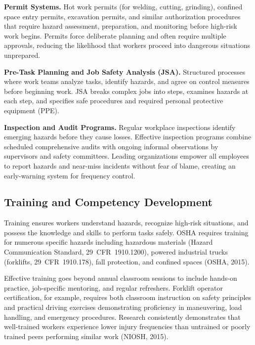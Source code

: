 \documentclass[11pt,openany]{book}
\begin{document}
\textbf{Permit Systems.} Hot work permits (for welding, cutting, grinding),
confined space entry permits, excavation permits, and similar authorization
procedures that require hazard assessment, preparation, and monitoring before
high-risk work begins. Permits force deliberate planning and often require
multiple approvals, reducing the likelihood that workers proceed into
dangerous situations unprepared.

\textbf{Pre-Task Planning and Job Safety Analysis (JSA).} Structured processes
where work teams analyze tasks, identify hazards, and agree on control
measures before beginning work. JSA breaks complex jobs into steps, examines
hazards at each step, and specifies safe procedures and required personal
protective equipment (PPE).

\textbf{Inspection and Audit Programs.} Regular workplace inspections identify
emerging hazards before they cause losses. Effective inspection programs
combine scheduled comprehensive audits with ongoing informal observations by
supervisors and safety committees. Leading organizations empower all employees
to report hazards and near-miss incidents without fear of blame, creating an
early-warning system for frequency control.

\subsection{Training and Competency Development}

Training ensures workers understand hazards, recognize high-risk situations,
and possess the knowledge and skills to perform tasks safely. OSHA requires
training for numerous specific hazards including hazardous materials (Hazard
Communication Standard, 29~CFR~1910.1200), powered industrial trucks
(forklifts, 29~CFR~1910.178), fall protection, and confined spaces (OSHA,
2015).

Effective training goes beyond annual classroom sessions to include hands-on
practice, job-specific mentoring, and regular refreshers. Forklift operator
certification, for example, requires both classroom instruction on safety
principles and practical driving exercises demonstrating proficiency in
maneuvering, load handling, and emergency procedures. Research consistently
demonstrates that well-trained workers experience lower injury frequencies
than untrained or poorly trained peers performing similar work (NIOSH, 2015).
\end{document}

